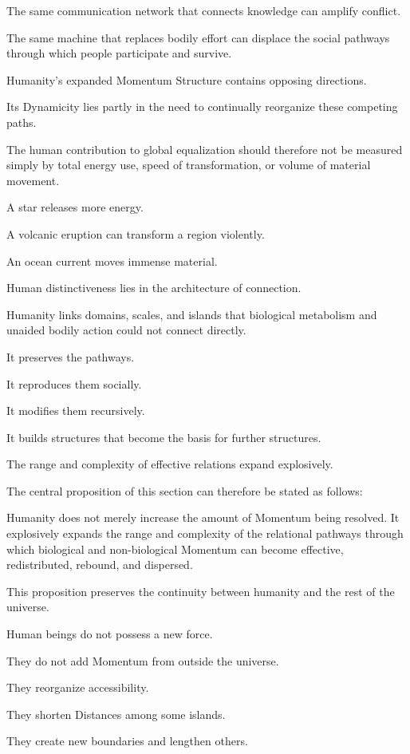 The same communication network that connects knowledge can amplify conflict.

The same machine that replaces bodily effort can displace the social pathways through which people participate and survive.

Humanity’s expanded Momentum Structure contains opposing directions.

Its Dynamicity lies partly in the need to continually reorganize these competing paths.

The human contribution to global equalization should therefore not be measured simply by total energy use, speed of transformation, or volume of material movement.

A star releases more energy.

A volcanic eruption can transform a region violently.

An ocean current moves immense material.

Human distinctiveness lies in the architecture of connection.

Humanity links domains, scales, and islands that biological metabolism and unaided bodily action could not connect directly.

It preserves the pathways.

It reproduces them socially.

It modifies them recursively.

It builds structures that become the basis for further structures.

The range and complexity of effective relations expand explosively.

The central proposition of this section can therefore be stated as follows:

Humanity does not merely increase the amount of Momentum being resolved. It explosively expands the range and complexity of the relational pathways through which biological and non-biological Momentum can become effective, redistributed, rebound, and dispersed.

This proposition preserves the continuity between humanity and the rest of the universe.

Human beings do not possess a new force.

They do not add Momentum from outside the universe.

They reorganize accessibility.

They shorten Distances among some islands.

They create new boundaries and lengthen others.

